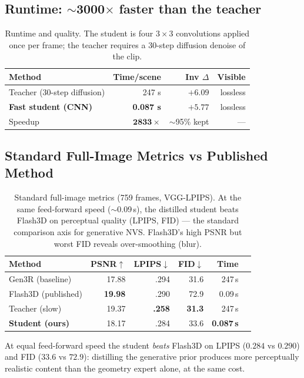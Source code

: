 \documentclass[10pt,twocolumn,letterpaper]{article}
\begin{document}
\subsection{Runtime: $\sim$3000$\times$ faster than the teacher}
\begin{table}[t]
\centering\small
\caption{Runtime and quality. The student is four $3\times3$ convolutions applied
once per frame; the teacher requires a 30-step diffusion denoise of the clip.}
\begin{tabular}{lrrr}
\toprule
Method & Time/scene & Inv $\Delta$ & Visible \\
\midrule
Teacher (30-step diffusion) & 247 s & $+6.09$ & lossless \\
\textbf{Fast student (CNN)} & \textbf{0.087 s} & $\mathbf{+5.77}$ & lossless \\
Speedup & $\mathbf{2833\times}$ & $\sim$95\% kept & --- \\
\bottomrule
\end{tabular}
\end{table}

\subsection{Standard Full-Image Metrics vs Published Method}
\begin{table}[t]
\centering\small
\caption{Standard full-image metrics (759 frames, VGG-LPIPS). At the same
feed-forward speed ($\sim$0.09\,s), the distilled student beats Flash3D on
perceptual quality (LPIPS, FID) --- the standard comparison axis for generative
NVS. Flash3D's high PSNR but worst FID reveals over-smoothing (blur).}
\begin{tabular}{lrrrrr}
\toprule
Method & PSNR$\uparrow$ & LPIPS$\downarrow$ & FID$\downarrow$ & Time \\
\midrule
Gen3R (baseline) & 17.88 & .294 & 31.6 & 247\,s \\
Flash3D (published) & \textbf{19.98} & .290 & 72.9 & 0.09\,s \\
Teacher (slow) & 19.37 & \textbf{.258} & \textbf{31.3} & 247\,s \\
\textbf{Student (ours)} & 18.17 & .284 & 33.6 & \textbf{0.087\,s} \\
\bottomrule
\end{tabular}
\end{table}
At equal feed-forward speed the student \emph{beats} Flash3D on LPIPS ($0.284$
vs $0.290$) and FID ($33.6$ vs $72.9$): distilling the generative prior produces
more perceptually realistic content than the geometry expert alone, at the same
cost.
\end{document}
